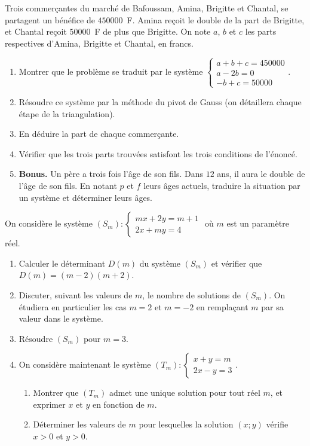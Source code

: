 \documentclass[11pt]{article}
\begin{document}
\begin{exercice}
Trois commerçantes du marché de Bafoussam, Amina, Brigitte et Chantal, se partagent un bénéfice de $\num{450000}$~F. Amina reçoit le double de la part de Brigitte, et Chantal reçoit $\num{50000}$~F de plus que Brigitte. On note $a$, $b$ et $c$ les parts respectives d'Amina, Brigitte et Chantal, en francs.
\begin{enumerate}
\item Montrer que le problème se traduit par le système $\begin{cases} a + b + c = \num{450000} \\ a - 2b = 0 \\ -b + c = \num{50000} \end{cases}$.
\item Résoudre ce système par la méthode du pivot de Gauss (on détaillera chaque étape de la triangulation).
\item En déduire la part de chaque commerçante.
\item Vérifier que les trois parts trouvées satisfont les trois conditions de l'énoncé.
\item \textbf{Bonus.} Un père a trois fois l'âge de son fils. Dans $12$ ans, il aura le double de l'âge de son fils. En notant $p$ et $f$ leurs âges actuels, traduire la situation par un système et déterminer leurs âges.
\end{enumerate}
\end{exercice}

\begin{exercice}
On considère le système $(S_m) : \begin{cases} mx + 2y = m + 1 \\ 2x + my = 4 \end{cases}$ où $m$ est un paramètre réel.
\begin{enumerate}
\item Calculer le déterminant $D(m)$ du système $(S_m)$ et vérifier que $D(m) = (m - 2)(m + 2)$.
\item Discuter, suivant les valeurs de $m$, le nombre de solutions de $(S_m)$. On étudiera en particulier les cas $m = 2$ et $m = -2$ en remplaçant $m$ par sa valeur dans le système.
\item Résoudre $(S_m)$ pour $m = 3$.
\item On considère maintenant le système $(T_m) : \begin{cases} x + y = m \\ 2x - y = 3 \end{cases}$.
\begin{enumerate}
\item Montrer que $(T_m)$ admet une unique solution pour tout réel $m$, et exprimer $x$ et $y$ en fonction de $m$.
\item Déterminer les valeurs de $m$ pour lesquelles la solution $(x ; y)$ vérifie $x > 0$ et $y > 0$.
\end{enumerate}
\end{enumerate}
\end{exercice}
\end{document}
